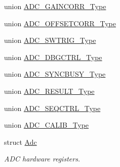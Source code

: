 \begin{DoxyCompactItemize}
\item 
union \hyperlink{union_a_d_c___g_a_i_n_c_o_r_r___type}{A\+D\+C\+\_\+\+G\+A\+I\+N\+C\+O\+R\+R\+\_\+\+Type}
\item 
union \hyperlink{union_a_d_c___o_f_f_s_e_t_c_o_r_r___type}{A\+D\+C\+\_\+\+O\+F\+F\+S\+E\+T\+C\+O\+R\+R\+\_\+\+Type}
\item 
union \hyperlink{union_a_d_c___s_w_t_r_i_g___type}{A\+D\+C\+\_\+\+S\+W\+T\+R\+I\+G\+\_\+\+Type}
\item 
union \hyperlink{union_a_d_c___d_b_g_c_t_r_l___type}{A\+D\+C\+\_\+\+D\+B\+G\+C\+T\+R\+L\+\_\+\+Type}
\item 
union \hyperlink{union_a_d_c___s_y_n_c_b_u_s_y___type}{A\+D\+C\+\_\+\+S\+Y\+N\+C\+B\+U\+S\+Y\+\_\+\+Type}
\item 
union \hyperlink{union_a_d_c___r_e_s_u_l_t___type}{A\+D\+C\+\_\+\+R\+E\+S\+U\+L\+T\+\_\+\+Type}
\item 
union \hyperlink{union_a_d_c___s_e_q_c_t_r_l___type}{A\+D\+C\+\_\+\+S\+E\+Q\+C\+T\+R\+L\+\_\+\+Type}
\item 
union \hyperlink{union_a_d_c___c_a_l_i_b___type}{A\+D\+C\+\_\+\+C\+A\+L\+I\+B\+\_\+\+Type}
\item 
struct \hyperlink{struct_adc}{Adc}
\begin{DoxyCompactList}\small\item\em A\+D\+C hardware registers. \end{DoxyCompactList}\end{DoxyCompactItemize}
